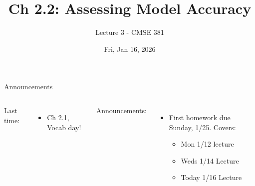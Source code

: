 \documentclass[aspectratio=169,dvipsnames]{beamer}
\begin{document}
\title[Lec 2]{Ch 2.2: Assessing Model Accuracy}
\subtitle{Lecture 3 - CMSE 381}
\date{Fri, Jan 16, 2026}




\begin{frame}
 \titlepage


\end{frame}
\begin{frame}[c]{Announcements}

\begin{columns}
\centering

	Last time:
	\begin{itemize}
		\item Ch 2.1, Vocab day!
	\end{itemize}
\centering

	Announcements: 
	\begin{itemize}
		\item First homework due Sunday, 1/25. Covers:
		\begin{itemize}
			\item Mon 1/12 lecture
			\item Weds 1/14 Lecture
			\item Today 1/16 Lecture
		\end{itemize}
		\end{itemize}
\end{columns}

\end{frame}
\end{document}
